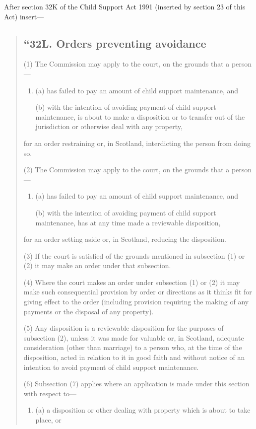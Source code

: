 \documentclass[a4paper]{article}
\begin{document}
After section 32K of the Child Support Act 1991 (inserted by section 23 of this Act) insert---
\begin{quotation}
\subsection*{``32L. Orders preventing avoidance}

(1) The Commission may apply to the court, on the grounds that a person---
\begin{enumerate}\item[]
(a) has failed to pay an amount of child support maintenance, and

(b) with the intention of avoiding payment of child support maintenance, is about to make a disposition or to transfer out of the jurisdiction or otherwise deal with any property,
\end{enumerate}
for an order restraining or, in Scotland, interdicting the person from doing so.

(2) The Commission may apply to the court, on the grounds that a person---
\begin{enumerate}\item[]
(a) has failed to pay an amount of child support maintenance, and

(b) with the intention of avoiding payment of child support maintenance, has at any time made a reviewable disposition,
\end{enumerate}
for an order setting aside or, in Scotland, reducing the disposition.

(3)
If the court is satisfied of the grounds mentioned in subsection (1) or (2) it may make an order under that subsection.

(4)
Where the court makes an order under subsection (1) or (2) it may make such consequential provision by order or directions as it thinks fit for giving effect to the order (including provision requiring the making of any payments or the disposal of any property).

(5)
Any disposition is a reviewable disposition for the purposes of subsection (2), unless it was made for valuable or, in Scotland, adequate consideration (other than marriage) to a person who, at the time of the disposition, acted in relation to it in good faith and without notice of an intention to avoid payment of child support maintenance.

(6)
Subsection (7) applies where an application is made under this section with respect to---
\begin{enumerate}\item[]
(a) a disposition or other dealing with property which is about to take place, or


\end{enumerate}
\end{quotation}
\end{document}
